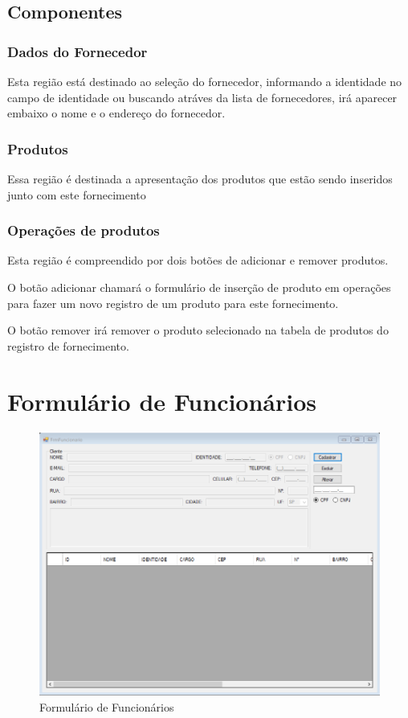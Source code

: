 \documentclass[
	article,			%
	12pt,				%
	oneside,			%
	a4paper,			%
	english,			%
	brazil,				%
	sumario=tradicional
	]{abntex2}
\begin{document}
	\subsection{Componentes}
	\subsubsection{Dados do Fornecedor}
	Esta região está destinado ao seleção do fornecedor, informando a identidade no campo de identidade ou buscando atráves da lista de fornecedores, irá aparecer embaixo o nome e o endereço do fornecedor.
	\subsubsection{Produtos}
	Essa região é destinada a apresentação dos produtos que estão sendo inseridos junto com este fornecimento
	\subsubsection{Operações de produtos}
	Esta região é compreendido por dois botões de adicionar e remover produtos.
	
	O botão adicionar chamará o formulário de inserção de produto em operações para fazer um novo registro de um produto para este fornecimento.
	
	O botão remover irá remover o produto selecionado na tabela de produtos do registro de fornecimento.
	
\newpage
	\section{Formulário de Funcionários}
	\begin{figure}[!htb]
		\centering
		\includegraphics[scale=0.6]{../Figuras/FrmFuncionario.png}
		\caption{Formulário de Funcionários}
	\end{figure}
\end{document}
